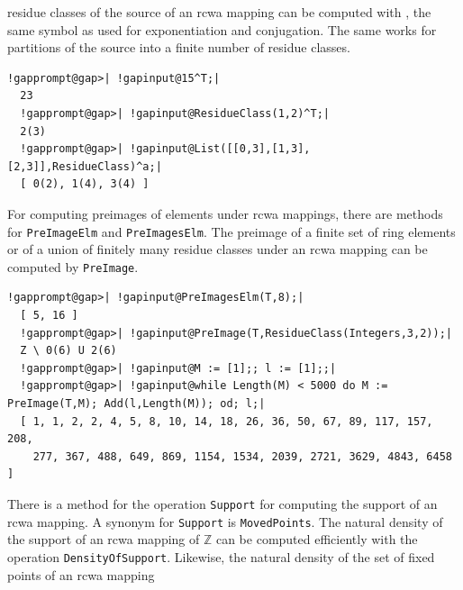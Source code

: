 \documentclass[a4paper,11pt]{report}
\begin{document}
{{residue classes of the source of an rcwa mapping can be computed with \texttt{\texttt{}}, the same symbol as used for exponentiation and conjugation. The same works
for partitions of the source into a finite number of residue classes. 
\begin{Verbatim}[commandchars=!@|,fontsize=\small,frame=single,label=Example]
  !gapprompt@gap>| !gapinput@15^T;|
  23
  !gapprompt@gap>| !gapinput@ResidueClass(1,2)^T;|
  2(3)
  !gapprompt@gap>| !gapinput@List([[0,3],[1,3],[2,3]],ResidueClass)^a;|
  [ 0(2), 1(4), 3(4) ]
\end{Verbatim}
     For computing preimages of elements under rcwa mappings, there are methods for \texttt{PreImageElm} and \texttt{PreImagesElm}. The preimage of a finite set of ring elements or of a union of finitely many
residue classes under an rcwa mapping can be computed by \texttt{PreImage}. 
\begin{Verbatim}[commandchars=!@|,fontsize=\small,frame=single,label=Example]
  !gapprompt@gap>| !gapinput@PreImagesElm(T,8);|
  [ 5, 16 ]
  !gapprompt@gap>| !gapinput@PreImage(T,ResidueClass(Integers,3,2));|
  Z \ 0(6) U 2(6)
  !gapprompt@gap>| !gapinput@M := [1];; l := [1];;|
  !gapprompt@gap>| !gapinput@while Length(M) < 5000 do M := PreImage(T,M); Add(l,Length(M)); od; l;|
  [ 1, 1, 2, 2, 4, 5, 8, 10, 14, 18, 26, 36, 50, 67, 89, 117, 157, 208, 
    277, 367, 488, 649, 869, 1154, 1534, 2039, 2721, 3629, 4843, 6458 ]
\end{Verbatim}
      There is a method for the operation \texttt{Support} for computing the support of an rcwa mapping. A synonym for \texttt{Support} is \texttt{MovedPoints}. The natural density of the support of an rcwa mapping of
{\ensuremath{\mathbb Z}} can be computed efficiently with the operation \texttt{DensityOfSupport}. Likewise, the natural density of the set of fixed points of an rcwa mapping
}}
\end{document}
